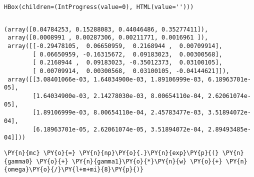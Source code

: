     \begin{verbatim}
HBox(children=(IntProgress(value=0), HTML(value='')))
    \end{verbatim}


    \begin{Verbatim}[commandchars=\\\{\}]

    \end{Verbatim}

            \begin{tcolorbox}[breakable, size=fbox, boxrule=.5pt, pad at break*=1mm, opacityfill=0]
\begin{Verbatim}[commandchars=\\\{\}]
(array([0.04784253, 0.15288083, 0.44046486, 0.35277411]),
 array([0.0008991 , 0.00287306, 0.00211771, 0.0016961 ]),
 array([[-0.29478105,  0.06650959,  0.2168944 ,  0.00709914],
        [ 0.06650959, -0.16315672,  0.09183023,  0.00300568],
        [ 0.2168944 ,  0.09183023, -0.35012373,  0.03100105],
        [ 0.00709914,  0.00300568,  0.03100105, -0.04144621]]),
 array([[3.08401066e-03, 1.64034900e-03, 1.89106999e-03, 6.18963701e-05],
        [1.64034900e-03, 2.14278030e-03, 8.00654110e-04, 2.62061074e-05],
        [1.89106999e-03, 8.00654110e-04, 2.45783477e-03, 3.51894072e-04],
        [6.18963701e-05, 2.62061074e-05, 3.51894072e-04, 2.89493485e-04]]))
\end{Verbatim}
\end{tcolorbox}

    \begin{tcolorbox}[breakable, size=fbox, boxrule=1pt, pad at break*=1mm,colback=cellbackground, colframe=cellborder]
\begin{Verbatim}[commandchars=\\\{\}]
\PY{n}{mc} \PY{o}{=} \PY{n}{np}\PY{o}{.}\PY{n}{exp}\PY{p}{(} \PY{n}{gamma0} \PY{o}{+} \PY{n}{gamma1}\PY{o}{*}\PY{n}{w} \PY{o}{+} \PY{n}{omega}\PY{o}{/}\PY{l+m+mi}{8}\PY{p}{)}
\end{Verbatim}
\end{tcolorbox}

